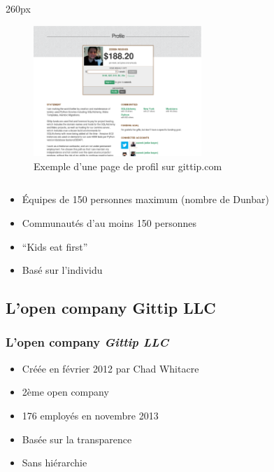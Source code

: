 {
\logo{}
\begin{frame}
\begin{center}
\begin{columns}
\begin{column}{260px}
{
    \begin{figure}[h!]
        \centering
        \includegraphics[width=240px]{images/section1/profilepage-gittip.eps}
        \caption{Exemple d'une page de profil sur gittip.com}
    \end{figure}
}
\end{column}
\end{columns}
\end{center}
\end{frame}
}


\begin{frame}

\begin{itemize}
    \itemsep1.5em
    \item Équipes de 150 personnes maximum (nombre de Dunbar)
    \item Communautés d'au moins 150 personnes
    \item ``Kids eat first''
    \item Basé sur l'individu
\end{itemize}
\end{frame}

    \subsection{L'open company Gittip LLC}


\begin{frame}
\frametitle{L'open company \emph{Gittip LLC}}

\begin{itemize}
    \itemsep1.5em
    \item Créée en février 2012 par Chad Whitacre
    \item 2ème open company
    \item 176 employés en novembre 2013
    \item Basée sur la transparence
    \item Sans hiérarchie
\end{itemize}
\end{frame}


